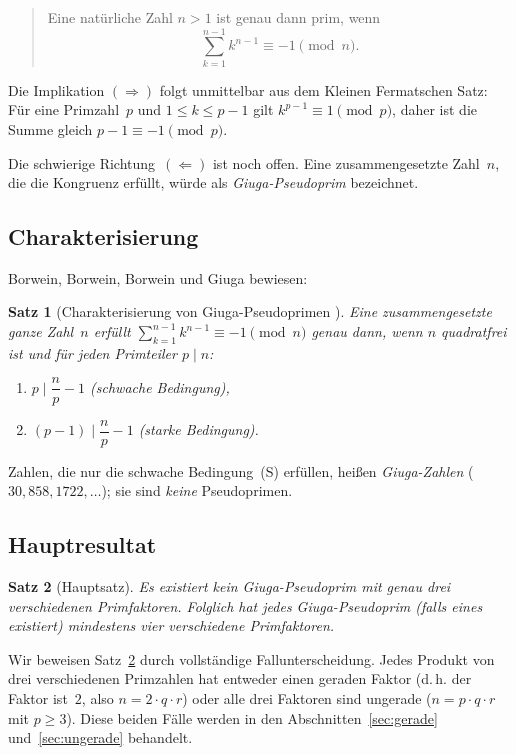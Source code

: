 \documentclass[12pt,a4paper]{amsart}
\newtheorem{theorem}{Satz}[section]
\theoremstyle{definition}
\begin{document}
\begin{quote}
  Eine natürliche Zahl $n > 1$ ist genau dann prim, wenn
  \[
    \sum_{k=1}^{n-1} k^{n-1} \equiv -1 \pmod{n}.
  \]
\end{quote}

Die Implikation $({\Rightarrow})$ folgt unmittelbar aus dem Kleinen Fermatschen Satz:
Für eine Primzahl~$p$ und $1 \le k \le p-1$ gilt $k^{p-1} \equiv 1 \pmod{p}$,
daher ist die Summe gleich $p - 1 \equiv -1 \pmod{p}$.

Die schwierige Richtung~$({\Leftarrow})$ ist noch offen. Eine zusammengesetzte Zahl~$n$,
die die Kongruenz erfüllt, würde als \emph{Giuga-Pseudoprim} bezeichnet.

\subsection{Charakterisierung}

Borwein, Borwein, Borwein und Giuga \cite{Borwein1996} bewiesen:

\begin{theorem}[Charakterisierung von Giuga-Pseudoprimen {\cite{Borwein1996}}]
\label{thm:char}
Eine zusammengesetzte ganze Zahl~$n$ erfüllt $\sum_{k=1}^{n-1} k^{n-1} \equiv -1 \pmod{n}$
genau dann, wenn $n$ quadratfrei ist und für jeden Primteiler $p \mid n$:
\begin{enumerate}
  \item[\textup{(S)}] $p \mid \dfrac{n}{p} - 1$  \quad\emph{(schwache Bedingung)},
  \item[\textup{(St)}] $(p-1) \mid \dfrac{n}{p} - 1$ \quad\emph{(starke Bedingung)}.
\end{enumerate}
\end{theorem}

Zahlen, die nur die schwache Bedingung~(S) erfüllen, heißen \emph{Giuga-Zahlen}
($30, 858, 1722, \ldots$); sie sind \emph{keine} Pseudoprimen.

\subsection{Hauptresultat}

\begin{theorem}[Hauptsatz]
\label{thm:haupt}
Es existiert kein Giuga-Pseudoprim mit genau drei verschiedenen Primfaktoren.
Folglich hat jedes Giuga-Pseudoprim (falls eines existiert) mindestens vier
verschiedene Primfaktoren.
\end{theorem}

Wir beweisen Satz~\ref{thm:haupt} durch vollständige Fallunterscheidung.
Jedes Produkt von drei verschiedenen Primzahlen hat entweder einen geraden Faktor
(d.\,h. der Faktor ist~$2$, also $n = 2 \cdot q \cdot r$) oder alle drei Faktoren
sind ungerade ($n = p \cdot q \cdot r$ mit $p \ge 3$). Diese beiden Fälle werden in
den Abschnitten~\ref{sec:gerade} und~\ref{sec:ungerade} behandelt.
\end{document}
